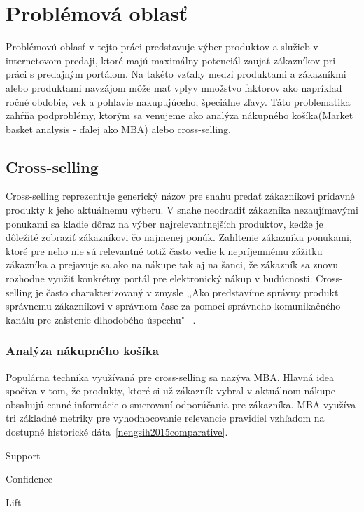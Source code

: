 \newpage


\chapter{Problémová oblasť}
\label{analyza_problemova_oblast}

Problémovú oblasť v tejto práci predstavuje výber produktov a služieb v internetovom predaji, ktoré majú maximálny potenciál zaujať zákazníkov pri práci s predajným portálom. Na takéto vzťahy medzi produktami a zákazníkmi alebo produktami navzájom môže mať vplyv množstvo faktorov ako napríklad ročné obdobie, vek a pohlavie nakupujúceho, špeciálne zľavy.
Táto problematika zahŕňa podproblémy, ktorým sa venujeme ako analýza nákupného košíka(Market basket analysis - ďalej ako MBA) alebo cross-selling.
 \newline
 
\section{Cross-selling}
\label{cross_selling}
Cross-selling reprezentuje generický názov pre snahu predať zákazníkovi prídavné produkty k jeho aktuálnemu výberu. V snahe neodradiť zákazníka nezaujímavými ponukami sa kladie dôraz na výber najrelevantnejších produktov, keďže je dôležité zobraziť zákazníkovi čo najmenej ponúk. Zahltenie zákazníka ponukami, ktoré pre neho nie sú relevantné totiž často vedie k nepríjemnému zážitku zákazníka a prejavuje sa ako na nákupe tak aj na šanci, že zákazník sa znovu rozhodne využiť konkrétny portál pre elektronický nákup v budúcnosti. Cross-selling je často charakterizovaný v zmysle ,,Ako predstavíme správny produkt správnemu zákazníkovi v správnom čase za pomoci správneho komunikačného kanálu pre zaistenie dlhodobého úspechu" ~\cite{li2011cross}.

\subsection{Analýza nákupného košíka}
\label{market_basket_analysis}

Populárna technika využívaná pre cross-selling sa nazýva MBA. Hlavná idea spočíva v tom, že produkty, ktoré si už zákazník vybral v aktuálnom nákupe obsahujú cenné informácie o smerovaní odporúčania pre zákazníka. MBA využíva tri základné metriky pre vyhodnocovanie relevancie pravidiel vzhľadom na dostupné historické dáta~\ref{nengsih2015comparative}. 

\begin{my_itemize}
	\item {Support}
	\item {Confidence}
	\item {Lift}
\end{my_itemize}

